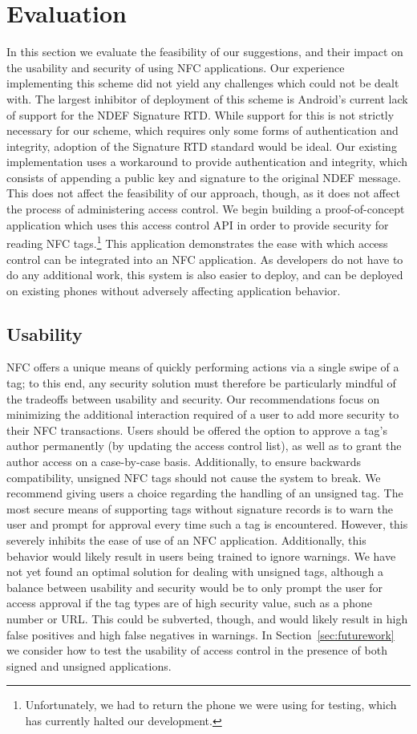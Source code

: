 \documentclass[12pt]{article}
\begin{document}
\section{Evaluation}
In this section we evaluate the feasibility of our suggestions, and their impact on the usability and security of using NFC applications.
Our experience implementing this scheme did not yield any challenges which could not be dealt with.
The largest inhibitor of deployment of this scheme is Android's current lack of support for the NDEF Signature RTD.
While support for this is not strictly necessary for our scheme, which requires only some forms of authentication and integrity, adoption of the Signature RTD standard would be ideal.
Our existing implementation uses a workaround to provide authentication and integrity, which consists of appending a public key and signature to the original NDEF message.
This does not affect the feasibility of our approach, though, as it does not affect the process of administering access control.
We begin building a proof-of-concept application which uses this access control API in order to provide security for reading NFC tags.\footnote{Unfortunately, we had to return the phone we were using for testing, which has currently halted our development.}
This application demonstrates the ease with which access control can be integrated into an NFC application.
As developers do not have to do any additional work, this system is also easier to deploy, and can be deployed on existing phones without adversely affecting application behavior.
\subsection{Usability}
NFC offers a unique means of quickly performing actions via a single swipe of a tag; to this end, any security solution must therefore be particularly mindful of the tradeoffs between usability and security.
Our recommendations focus on minimizing the additional interaction required of a user to add more security to their NFC transactions.
Users should be offered the option to approve a tag's author permanently (by updating the access control list), as well as to grant the author access on a case-by-case basis.
Additionally, to ensure backwards compatibility, unsigned NFC tags should not cause the system to break.
We recommend giving users a choice regarding the handling of an unsigned tag.
The most secure means of supporting tags without signature records is to warn the user and prompt for approval every time such a tag is encountered.
However, this severely inhibits the ease of use of an NFC application.
Additionally, this behavior would likely result in users being trained to ignore warnings.
We have not yet found an optimal solution for dealing with unsigned tags, although a balance between usability and security would be to only prompt the user for access approval if the tag types are of high security value, such as a phone number or URL.
This could be subverted, though, and would likely result in high false positives and high false negatives in warnings.
In Section~\ref{sec:futurework} we consider how to test the usability of access control in the presence of both signed and unsigned applications.
\end{document}
